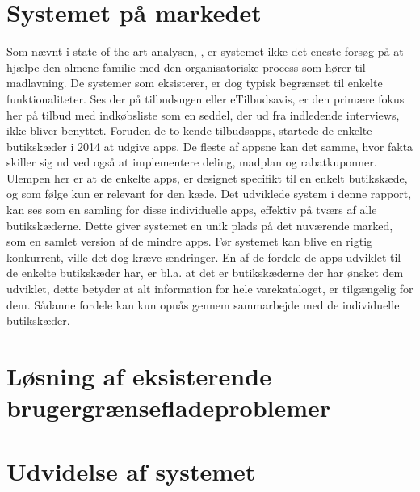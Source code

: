 \section{Systemet på markedet}
Som nævnt i state of the art analysen, , er systemet ikke det eneste forsøg på at hjælpe den almene familie med den organisatoriske process som hører til madlavning.
De systemer som eksisterer, er dog typisk begrænset til enkelte funktionaliteter.
Ses der på tilbudsugen eller eTilbudsavis, er den primære fokus her på tilbud med indkøbsliste som en seddel, der ud fra indledende interviews, ikke bliver benyttet.
Foruden de to kende tilbudsapps, startede de enkelte butikskæder i 2014 at udgive apps.
De fleste af appsne kan det samme, hvor fakta skiller sig ud ved også at implementere deling, madplan og rabatkuponner.
Ulempen her er at de enkelte apps, er designet specifikt til en enkelt butikskæde, og som følge kun er relevant for den kæde.
Det udviklede system i denne rapport, kan ses som en samling for disse individuelle apps, effektiv på tværs af alle butikskæderne.
Dette giver systemet en unik plads på det nuværende marked, som en samlet version af de mindre apps.
Før systemet kan blive en rigtig konkurrent, ville det dog kræve ændringer.
En af de fordele de apps udviklet til de enkelte butikskæder har, er bl.a. at det er butikskæderne der har ønsket dem udviklet, dette betyder at alt information for hele varekataloget, er tilgængelig for dem.
Sådanne fordele kan kun opnås gennem sammarbejde med de individuelle butikskæder.

\section{Løsning af eksisterende brugergrænsefladeproblemer}

\section{Udvidelse af systemet}
